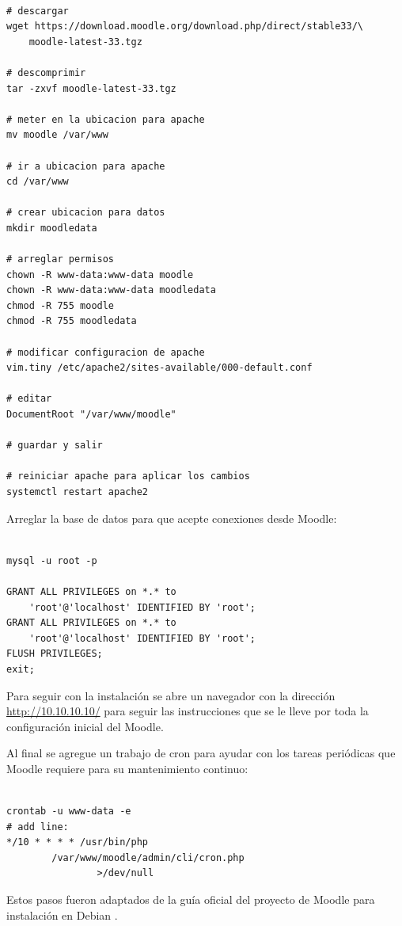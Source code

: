 \begin{lstlisting}

# descargar
wget https://download.moodle.org/download.php/direct/stable33/\
	moodle-latest-33.tgz

# descomprimir
tar -zxvf moodle-latest-33.tgz

# meter en la ubicacion para apache
mv moodle /var/www

# ir a ubicacion para apache
cd /var/www

# crear ubicacion para datos
mkdir moodledata

# arreglar permisos
chown -R www-data:www-data moodle
chown -R www-data:www-data moodledata
chmod -R 755 moodle
chmod -R 755 moodledata

# modificar configuracion de apache
vim.tiny /etc/apache2/sites-available/000-default.conf

# editar
DocumentRoot "/var/www/moodle"

# guardar y salir

# reiniciar apache para aplicar los cambios
systemctl restart apache2

\end{lstlisting}

Arreglar la base de datos para que acepte conexiones desde Moodle:

\begin{lstlisting}

mysql -u root -p

GRANT ALL PRIVILEGES on *.* to
	'root'@'localhost' IDENTIFIED BY 'root';
GRANT ALL PRIVILEGES on *.* to
	'root'@'localhost' IDENTIFIED BY 'root';
FLUSH PRIVILEGES;
exit;

\end{lstlisting}

Para seguir con la instalación se abre un navegador con la dirección \url{http://10.10.10.10/} para seguir las instrucciones que se le lleve por toda la configuración inicial del Moodle.

Al final se agregue un trabajo de cron para ayudar con los tareas periódicas que Moodle requiere para su mantenimiento continuo:

\begin{lstlisting}

crontab -u www-data -e
# add line:
*/10 * * * * /usr/bin/php
		/var/www/moodle/admin/cli/cron.php
        		>/dev/null

\end{lstlisting}

Estos pasos fueron adaptados de la guía oficial del proyecto de Moodle para instalación en Debian \citep{MOODLE-Install-Debian}.

